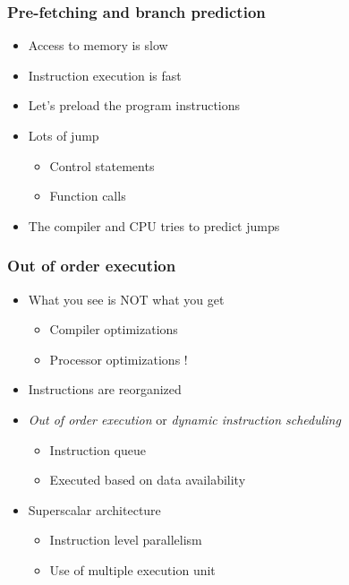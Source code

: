 \begin{frame}
  \frametitle{Pre-fetching and branch prediction}

  \begin{itemize}
  \item Access to memory is slow
  \item Instruction execution is fast
  \item Let's preload the program instructions
  \item Lots of jump
    \begin{itemize}
    \item Control statements
    \item Function calls
    \end{itemize}
  \item The compiler and CPU tries to predict jumps
  \end{itemize}
\end{frame}


\begin{frame}
  \frametitle{Out of order execution}

  \begin{itemize}
  \item What you see is NOT what you get
    \begin{itemize}
    \item Compiler optimizations
    \item Processor optimizations !
    \end{itemize}
  \item Instructions are reorganized
  \item \emph{Out of order execution} or \emph{dynamic instruction scheduling}
    \begin{itemize}
    \item Instruction queue
    \item Executed based on data availability
    \end{itemize}
  \item Superscalar architecture
    \begin{itemize}
    \item Instruction level parallelism
    \item Use of multiple execution unit
    \end{itemize}
  \end{itemize}
\end{frame}


